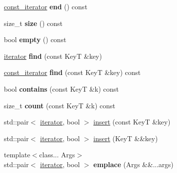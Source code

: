 \begin{DoxyCompactItemize}
\item 
\hypertarget{classemlib_1_1_hash_set_ac9e6d81647b36cf48d134136c40f10ab}{\hyperlink{classemlib_1_1_hash_set_1_1const__iterator}{const\+\_\+iterator} {\bfseries end} () const }\label{classemlib_1_1_hash_set_ac9e6d81647b36cf48d134136c40f10ab}

\item 
\hypertarget{classemlib_1_1_hash_set_acc0987ad484b631ed3a1dee189f342ed}{size\+\_\+t {\bfseries size} () const }\label{classemlib_1_1_hash_set_acc0987ad484b631ed3a1dee189f342ed}

\item 
\hypertarget{classemlib_1_1_hash_set_a174ba340574d75db9e35a7179c8beb37}{bool {\bfseries empty} () const }\label{classemlib_1_1_hash_set_a174ba340574d75db9e35a7179c8beb37}

\item 
\hypertarget{classemlib_1_1_hash_set_a9a5f70682a63bb0835512d523c7f036e}{\hyperlink{classemlib_1_1_hash_set_1_1iterator}{iterator} {\bfseries find} (const Key\+T \&key)}\label{classemlib_1_1_hash_set_a9a5f70682a63bb0835512d523c7f036e}

\item 
\hypertarget{classemlib_1_1_hash_set_ad83abd555d61321dd9113bf44170454d}{\hyperlink{classemlib_1_1_hash_set_1_1const__iterator}{const\+\_\+iterator} {\bfseries find} (const Key\+T \&key) const }\label{classemlib_1_1_hash_set_ad83abd555d61321dd9113bf44170454d}

\item 
\hypertarget{classemlib_1_1_hash_set_a1845c869121d844431dacce0a1a1b07a}{bool {\bfseries contains} (const Key\+T \&k) const }\label{classemlib_1_1_hash_set_a1845c869121d844431dacce0a1a1b07a}

\item 
\hypertarget{classemlib_1_1_hash_set_a24c36a2a6f233316a81f70ad4ea3de87}{size\+\_\+t {\bfseries count} (const Key\+T \&k) const }\label{classemlib_1_1_hash_set_a24c36a2a6f233316a81f70ad4ea3de87}

\item 
std\+::pair$<$ \hyperlink{classemlib_1_1_hash_set_1_1iterator}{iterator}, bool $>$ \hyperlink{classemlib_1_1_hash_set_aeda3330a52e968169d226a1923c2cf31}{insert} (const Key\+T \&key)
\item 
std\+::pair$<$ \hyperlink{classemlib_1_1_hash_set_1_1iterator}{iterator}, bool $>$ \hyperlink{classemlib_1_1_hash_set_a3f242776bdd81751c9e24c7917d2e773}{insert} (Key\+T \&\&key)
\item 
\hypertarget{classemlib_1_1_hash_set_a5b04767cb64cab01bbf28e1c6654346f}{{\footnotesize template$<$class... Args$>$ }\\std\+::pair$<$ \hyperlink{classemlib_1_1_hash_set_1_1iterator}{iterator}, bool $>$ {\bfseries emplace} (Args \&\&...args)}\label{classemlib_1_1_hash_set_a5b04767cb64cab01bbf28e1c6654346f}


\end{DoxyCompactItemize}
